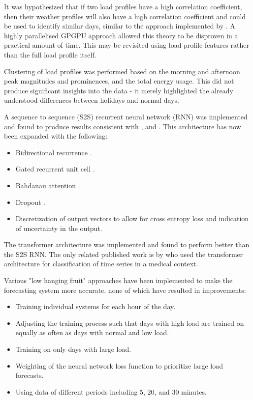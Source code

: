It was hypothesized that if two load profiles have a high correlation coefficient, then their weather profiles will also have a high correlation coefficient and could be used to identify similar days, similar to the approach implemented by \cite{Bennett2014}.
A highly parallelised GPGPU approach allowed this theory to be disproven in a practical amount of time.
This may be revisited using load profile features rather than the full load profile itself.

Clustering of load profiles was performed based on the morning and afternoon peak magnitudes and prominences, and the total energy usage.
This did not produce significant insights into the data - it merely highlighted the already understood differences between holidays and normal days.

A sequence to sequence (S2S) recurrent neural network (RNN) was implemented and found to produce results consistent with \citep{Marino2016}, \citep{Bianchi2017} and \citep{Kong2017}.
This architecture has now been expanded with the following:
\begin{itemize}
	\item Bidirectional recurrence \citep{Schuster1997}.
	\item Gated recurrent unit cell \citep{Cho2014}.
	\item Bahdanau attention \citep{BahdanauCB14}.
	\item Dropout \citep{srivastava14a}.
	\item Discretization of output vectors to allow for cross entropy loss and indication of uncertainty in the output.
\end{itemize}

The transformer architecture \citep{Vaswani2017} was implemented and found to perform better than the S2S RNN. The only related published work is by  \cite{Song2017} who used the transformer architecture for classification of time series in a medical context.

Various "low hanging fruit" approaches have been implemented to make the forecasting system more accurate, none of which have resulted in improvements:
\begin{itemize}
	\item Training individual systems for each hour of the day.
	\item Adjusting the training process such that days with high load are trained on equally as often as days with normal and low load.
	\item Training on only days with large load.
	\item Weighting of the neural network loss function to prioritize large load forecasts.
	\item Using data of different periods including 5, 20, and 30 minutes.
\end{itemize}

